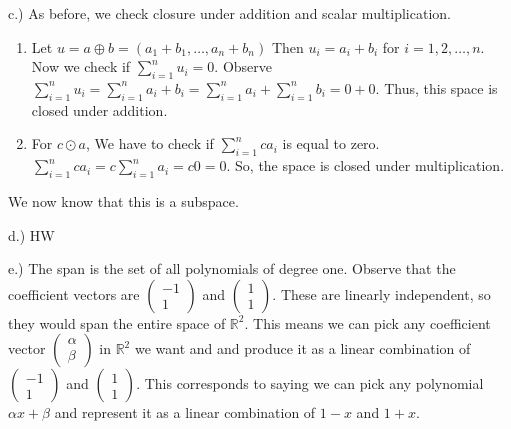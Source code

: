 \documentclass{article}
\begin{document}
\bigskip

c.) As before, we check closure under addition and scalar multiplication. 

\begin{enumerate}
\item Let $u=a\oplus b = (a_1+b_1, \dots, a_n + b_n)$ Then $u_i=a_i+b_i$ for $i=1,2,\dots,n$. Now we check if $\sum_{i=1}^n u_i = 0$. Observe $\sum_{i=1}^n u_i = \sum_{i=1}^n a_i+b_i =\sum_{i=1}^n a_i +\sum_{i=1}^n b_i = 0 + 0$. Thus, this space is closed under addition.
\item For $c\odot a$, We have to check if $\sum_{i=1}^n ca_i$ is equal to zero. $\sum_{i=1}^n ca_i = c\sum_{i=1}^n a_i = c0=0$. So, the space is closed under multiplication. 
\end{enumerate}

We now know that this is a subspace.

\bigskip
d.) HW

\bigskip
e.) The span is the set of all polynomials of degree one. Observe that the coefficient vectors are $\left( \begin{array}{c}
-1\\
1
\end{array}\right)$ and $\left( \begin{array}{c}
1\\
1
\end{array}\right)$. These are linearly independent, so they would span the entire space of $\mathbb{R}^2$. This means we can pick any coefficient vector $\left( \begin{array}{c}
\alpha \\
\beta
\end{array}\right)$ in $\mathbb{R}^2$ we want and and produce it as a linear combination of $\left( \begin{array}{c}
-1\\
1
\end{array}\right)$ and $\left( \begin{array}{c}
1\\
1
\end{array}\right)$. This corresponds to saying we can pick any polynomial $\alpha x +\beta$ and represent it as a linear combination of $1-x$ and $1+x$.
\end{document}
